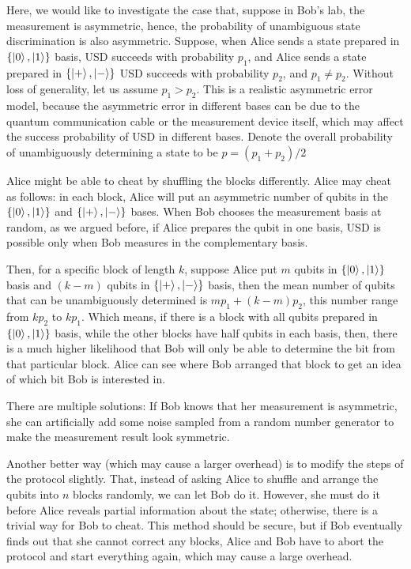 \documentclass[%
 reprint,
superscriptaddress,
 amsmath,amssymb,
 aps,
]{revtex4-2}
\begin{document}
Here, we would like to investigate the case that, suppose in Bob's lab, the measurement is asymmetric, hence, the probability of unambiguous state discrimination is also asymmetric. Suppose, when Alice sends a state prepared in $\{\ket{0}, \ket{1}\}$ basis, USD succeeds with probability $p_1$, and Alice sends a state prepared in $\{\ket{+}, \ket{-}\}$ USD succeeds with probability $p_2$, and $p_1\ne p_2$. Without loss of generality, let us assume $p_1> p_2$. This is a realistic asymmetric error model, because the asymmetric error in different bases can be due to the quantum communication cable or the measurement device itself, which may affect the success probability of USD in different bases. Denote the overall probability of unambiguously determining a state to be $p=(p_1+p_2)/2$

Alice might be able to cheat by shuffling the blocks differently. Alice may cheat as follows: in each block, Alice will put an asymmetric number of qubits in the $\{\ket{0}, \ket{1}\}$ and $\{\ket{+}, \ket{-}\}$ bases. When Bob chooses the measurement basis at random, as we argued before, if Alice prepares the qubit in one basis, USD is possible only when Bob measures in the complementary basis.

Then, for a specific block of length $k$, suppose Alice put $m$ qubits in $\{\ket{0}, \ket{1}\}$ basis and $(k-m)$ qubits in $\{\ket{+}, \ket{-}\}$ basis, then the mean number of qubits that can be unambiguously determined is $mp_1+(k-m)p_2$, this number range from $kp_2$ to $kp_1$. Which means, if there is a block with all qubits prepared in $\{\ket{0}, \ket{1}\}$ basis, while the other blocks have half qubits in each basis, then, there is a much higher likelihood that Bob will only be able to determine the bit from that particular block. Alice can see where Bob arranged that block to get an idea of which bit Bob is interested in.

There are multiple solutions: If Bob knows that her measurement is asymmetric, she can artificially add some noise sampled from a random number generator to make the measurement result look symmetric. 

Another better way (which may cause a larger overhead) is to modify the steps of the protocol slightly. That, instead of asking Alice to shuffle and arrange the qubits into $n$ blocks randomly, we can let Bob do it. However, she must do it before Alice reveals partial information about the state; otherwise, there is a trivial way for Bob to cheat. This method should be secure, but if Bob eventually finds out that she cannot correct any blocks, Alice and Bob have to abort the protocol and start everything again, which may cause a large overhead.
\end{document}
